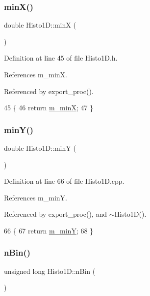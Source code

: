 \subsubsection{\texorpdfstring{min\+X()}{minX()}}
{\footnotesize\ttfamily double Histo1\+D\+::minX (\begin{DoxyParamCaption}{ }\end{DoxyParamCaption})\hspace{0.3cm}{\ttfamily [inline]}}



Definition at line 45 of file Histo1\+D.\+h.



References m\+\_\+minX.



Referenced by export\+\_\+proc().


\begin{DoxyCode}
45                \{ 
46     \textcolor{keywordflow}{return} \hyperlink{classHisto1D_af5ce58b20e96fa6e4b306109dd88589e}{m\_minX}; 
47   \}
\end{DoxyCode}
\mbox{\label{classHisto1D_a122c7071e060672dd2c08ad92212b3a2}} 
\subsubsection{\texorpdfstring{min\+Y()}{minY()}}
{\footnotesize\ttfamily double Histo1\+D\+::minY (\begin{DoxyParamCaption}{ }\end{DoxyParamCaption})}



Definition at line 66 of file Histo1\+D.\+cpp.



References m\+\_\+minY.



Referenced by export\+\_\+proc(), and $\sim$\+Histo1\+D().


\begin{DoxyCode}
66                     \{
67     \textcolor{keywordflow}{return} \hyperlink{classHisto1D_a3bb6c3ea23a1af14ebb10af807f3810d}{m\_minY};
68 \}
\end{DoxyCode}
\mbox{\label{classHisto1D_a7f3cf7364ae6e1eb9ba08b5ffe897d8f}} 
\subsubsection{\texorpdfstring{n\+Bin()}{nBin()}}
{\footnotesize\ttfamily unsigned long Histo1\+D\+::n\+Bin (\begin{DoxyParamCaption}{ }\end{DoxyParamCaption})\hspace{0.3cm}{\ttfamily [inline]}}



